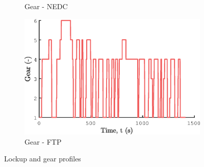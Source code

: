 \begin{figure}[ht]
\begin{subfigure}[b]{0.49\textwidth}
    \caption{Gear - NEDC}
    \label{fig:NEDC_gear}
  \end{subfigure}
  \begin{subfigure}[b]{0.49\textwidth}
    \includegraphics[width=\textwidth]{figures/model/FTP/gear.eps}
    \caption{Gear - FTP}
    \label{fig:FTP_gear}
  \end{subfigure}
  \caption{Lockup and gear profiles}\label{fig:lockup}
\end{figure}

